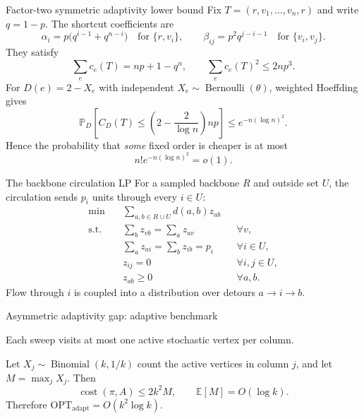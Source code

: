 \documentclass[aspectratio=169,12pt]{beamer}
\newcommand{\OPT}{\mathrm{OPT}}
\newcommand{\optadapt}{\OPT_{\mathrm{adapt}}}
\newcommand{\E}{\mathbb{E}}
\newcommand{\Pp}{\mathbb{P}}
\newcommand{\cost}{\operatorname{cost}}
\begin{document}
\begin{frame}{Factor-two symmetric adaptivity lower bound}
  \small Fix \(T=(r,v_1,\ldots,v_n,r)\) and write \(q=1-p\). The shortcut
  coefficients are
  \[
    \alpha_i=p\bigl(q^{i-1}+q^{n-i}\bigr)
    \quad\text{for }\{r,v_i\},
    \qquad
    \beta_{ij}=p^2q^{j-i-1}
    \quad\text{for }\{v_i,v_j\}.
  \]
  They satisfy
  \[
    \sum_e c_e(T)=np+1-q^n,
    \qquad
    \sum_e c_e(T)^2\le2np^3.
  \]
  For \(D(e)=2-X_e\) with independent
  \(X_e\sim\operatorname{Bernoulli}(\theta)\), weighted Hoeffding gives
  \[
    \Pp_D\!\left[
      C_D(T)\le\left(2-\frac{2}{\log n}\right)np
    \right]
    \le e^{-n(\log n)^2}.
  \]
  Hence the probability that \emph{some} fixed order is cheaper is at most
  \[
    n!e^{-n(\log n)^2}=o(1).
  \]
\end{frame}

\begin{frame}{The backbone circulation LP}
  For a sampled backbone \(R\) and outside set \(U\), the circulation sends
  \(p_i\) units through every \(i\in U\):
  \[
    \begin{aligned}
      \min\quad &\sum_{a,b\in R\cup U} d(a,b)z_{ab}\\
      \text{s.t.}\quad
      &\sum_b z_{vb}=\sum_a z_{av} &&\forall v,\\
      &\sum_a z_{ai}=\sum_b z_{ib}=p_i &&\forall i\in U,\\
      &z_{ij}=0 &&\forall i,j\in U,\\
      &z_{ab}\ge0 &&\forall a,b.
    \end{aligned}
  \]
  Flow through \(i\) is coupled into a distribution over detours
  \(a\to i\to b\).
\end{frame}

\begin{frame}{Asymmetric adaptivity gap: adaptive benchmark}
  \makebox[\linewidth][c]{%
    \resizebox{0.60\linewidth}{!}{\ThColumnSweep}%
  }

  \vspace{0.12cm}
  Each sweep visits at most one active stochastic vertex per column.

  \medskip
  Let \(X_j\sim\operatorname{Binomial}(k,1/k)\) count the active vertices in
  column \(j\), and let \(M=\max_jX_j\). Then
  \[
    \cost(\pi,A)\le2k^2M,
    \qquad \E[M]=O(\log k).
  \]
Therefore \(\optadapt=O(k^2\log k)\).
\end{frame}
\end{document}
